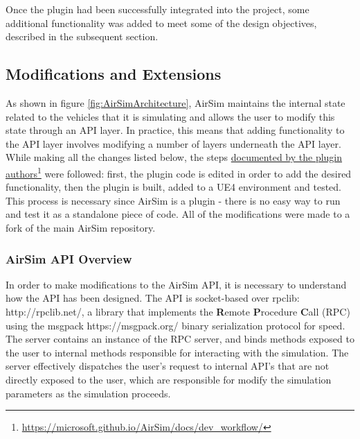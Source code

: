 Once the plugin had been successfully integrated into the project, some additional functionality was added to meet some of the design objectives, described in the subsequent section.

\subsection{Modifications and Extensions}

As shown in figure \ref{fig:AirSimArchitecture}, AirSim maintains the internal state related to the vehicles that it is simulating and allows the user to modify this state through an API layer. In practice, this means that adding functionality to the API layer involves modifying a number of layers underneath the API layer. 
While making all the changes listed below, the steps
\href{https://microsoft.github.io/AirSim/docs/dev\_workflow/}{documented by the plugin authors}\footnote{\href{https://microsoft.github.io/AirSim/docs/dev\_workflow/}{https://microsoft.github.io/AirSim/docs/dev\_workflow/}}
were followed: first, the plugin code is edited in order to add the desired functionality, then the plugin is built, added to a UE4 environment and tested. This process is necessary since AirSim is a plugin - there is no easy way to run and test it as a standalone piece of code. All of the modifications were made to a fork of the main AirSim repository.

\subsubsection{AirSim API Overview}
In order to make modifications to the AirSim API, it is necessary to understand how the API has been designed. The API is socket-based over rpclib: http://rpclib.net/, a library that implements the \textbf{R}emote \textbf{P}rocedure \textbf{C}all (RPC) using the msgpack https://msgpack.org/ binary serialization protocol for speed. The server contains an instance of the RPC server, and binds methods exposed to the user to internal methods responsible for interacting with the simulation. The server effectively dispatches the user's request to internal API's that are not directly exposed to the user, which are responsible for modify the simulation parameters as the simulation proceeds.

